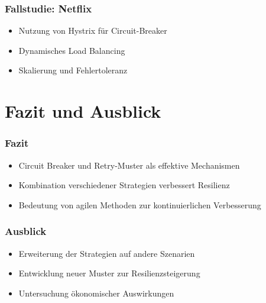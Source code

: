 \begin{frame}
    \frametitle{Fallstudie: Netflix}
    \begin{itemize}
        \item Nutzung von Hystrix für Circuit-Breaker
        \item Dynamisches Load Balancing
        \item Skalierung und Fehlertoleranz
    \end{itemize}
\end{frame}

\section{Fazit und Ausblick}

\begin{frame}
    \frametitle{Fazit}
    \begin{itemize}
        \item Circuit Breaker und Retry-Muster als effektive Mechanismen
        \item Kombination verschiedener Strategien verbessert Resilienz
        \item Bedeutung von agilen Methoden zur kontinuierlichen Verbesserung
    \end{itemize}
\end{frame}

\begin{frame}
    \frametitle{Ausblick}
    \begin{itemize}
        \item Erweiterung der Strategien auf andere Szenarien
        \item Entwicklung neuer Muster zur Resilienzsteigerung
        \item Untersuchung ökonomischer Auswirkungen
    \end{itemize}
\end{frame}

